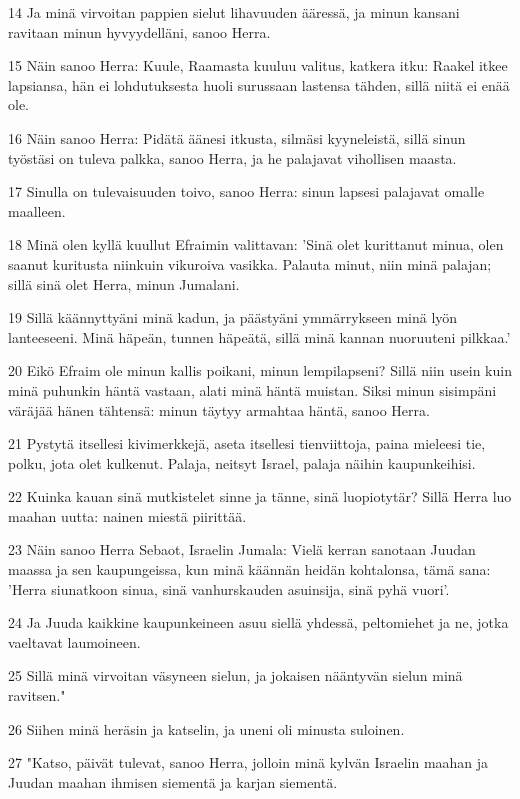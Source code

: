 \par 14 Ja minä virvoitan pappien sielut lihavuuden ääressä, ja minun kansani ravitaan minun hyvyydelläni, sanoo Herra.
\par 15 Näin sanoo Herra: Kuule, Raamasta kuuluu valitus, katkera itku: Raakel itkee lapsiansa, hän ei lohdutuksesta huoli surussaan lastensa tähden, sillä niitä ei enää ole.
\par 16 Näin sanoo Herra: Pidätä äänesi itkusta, silmäsi kyyneleistä, sillä sinun työstäsi on tuleva palkka, sanoo Herra, ja he palajavat vihollisen maasta.
\par 17 Sinulla on tulevaisuuden toivo, sanoo Herra: sinun lapsesi palajavat omalle maalleen.
\par 18 Minä olen kyllä kuullut Efraimin valittavan: 'Sinä olet kurittanut minua, olen saanut kuritusta niinkuin vikuroiva vasikka. Palauta minut, niin minä palajan; sillä sinä olet Herra, minun Jumalani.
\par 19 Sillä käännyttyäni minä kadun, ja päästyäni ymmärrykseen minä lyön lanteeseeni. Minä häpeän, tunnen häpeätä, sillä minä kannan nuoruuteni pilkkaa.'
\par 20 Eikö Efraim ole minun kallis poikani, minun lempilapseni? Sillä niin usein kuin minä puhunkin häntä vastaan, alati minä häntä muistan. Siksi minun sisimpäni väräjää hänen tähtensä: minun täytyy armahtaa häntä, sanoo Herra.
\par 21 Pystytä itsellesi kivimerkkejä, aseta itsellesi tienviittoja, paina mieleesi tie, polku, jota olet kulkenut. Palaja, neitsyt Israel, palaja näihin kaupunkeihisi.
\par 22 Kuinka kauan sinä mutkistelet sinne ja tänne, sinä luopiotytär? Sillä Herra luo maahan uutta: nainen miestä piirittää.
\par 23 Näin sanoo Herra Sebaot, Israelin Jumala: Vielä kerran sanotaan Juudan maassa ja sen kaupungeissa, kun minä käännän heidän kohtalonsa, tämä sana: 'Herra siunatkoon sinua, sinä vanhurskauden asuinsija, sinä pyhä vuori'.
\par 24 Ja Juuda kaikkine kaupunkeineen asuu siellä yhdessä, peltomiehet ja ne, jotka vaeltavat laumoineen.
\par 25 Sillä minä virvoitan väsyneen sielun, ja jokaisen nääntyvän sielun minä ravitsen."
\par 26 Siihen minä heräsin ja katselin, ja uneni oli minusta suloinen.
\par 27 "Katso, päivät tulevat, sanoo Herra, jolloin minä kylvän Israelin maahan ja Juudan maahan ihmisen siementä ja karjan siementä.
